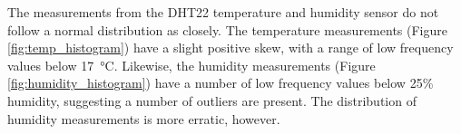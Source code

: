 \documentclass[11pt]{report}
\begin{document}
The measurements from the DHT22 temperature and humidity sensor do not follow a normal distribution as closely. The temperature measurements (Figure \ref{fig:temp_histogram}) have a slight positive skew, with a range of low frequency values below \SI{17}{\celsius}. Likewise, the humidity measurements (Figure \ref{fig:humidity_histogram}) have a number of low frequency values below 25\% humidity, suggesting a number of outliers are present. The distribution of humidity measurements is more erratic, however.

\end{document}
